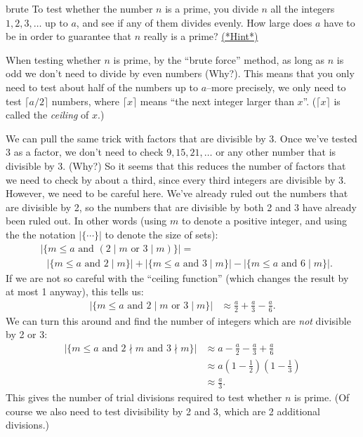\begin{exercise}{brute}
To test whether the number $n$ is a prime, you divide $n$ all the integers $1,2,3, \dots$ up to $a$, and see if any of them divides evenly.  How large does $a$ have to be in order to guarantee that $n$ really is a prime?
\hyperref[sec:Cryptography:Hints]{(*Hint*)}
\end{exercise}

When testing whether $n$ is prime, by the ``brute force'' method, as long as $n$ is odd we don't need to divide by even numbers (Why?). 
This means that you only need to test about half of the numbers up to $a$--more precisely, we only need to test $\lceil a/2 \rceil$ numbers, where $\lceil x \rceil$ means ``the next integer larger than $x$''. ($\lceil x \rceil$ is called the \emph{ceiling} of $x$.) 

We can pull the same trick with factors that are divisible by 3.  Once we've tested 3 as a factor, we don't need to check $9, 15, 21, \ldots$ or any other number that is divisible by 3.  (Why?)  So it seems that this reduces the number of factors that we need to check by about a third, since every third integers are divisible by 3. However, we need to be careful here. We've already ruled out the numbers that are divisible by 2, so the numbers that are divisible by both 2 and 3 have already been ruled out. In other words (using $m$ to denote a positive integer, and using the the notation $| \{ \cdots \} |$ to denote the size of sets):
\begin{align*}
&| \{ m \le a \text{ and } (2 \mid m \text{ or } 3 \mid m) \}| =\\ 
&~~~| \{ m \le a  \text{ and } 2 \mid m \}| + | \{ m \le a  \text{ and } 3 \mid m \}| - | \{ m \le a  \text{ and } 6 \mid m \}|.
\end{align*}
If we are not so careful with the ``ceiling function'' (which changes the result by at most 1 anyway), this tells us:
\begin{align*}
| \{ m \le a \text{ and } 2 \mid m \text{ or } 3 \mid m \}| &\approx 
\frac{a}{2} + \frac{a}{3} -\frac{a}{6}.
\end{align*}
We can turn this around and find the number of integers which are \emph{not} divisible by 2 or 3:
\begin{align*}
| \{ m \le a \text{ and } 2 \nmid m \text{ and } 3 \nmid m \}| &\approx 
a - \frac{a}{2} - \frac{a}{3} + \frac{a}{6} \\
&\approx a\left(1 - \frac{1}{2}\right) \left(1 - \frac{1}{3}\right)\\
&\approx \frac{a}{3}.
\end{align*}
This gives the number of trial divisions required to test whether $n$ is prime. (Of course we also need to test divisibility by 2 and 3, which are 2 additional divisions.)

